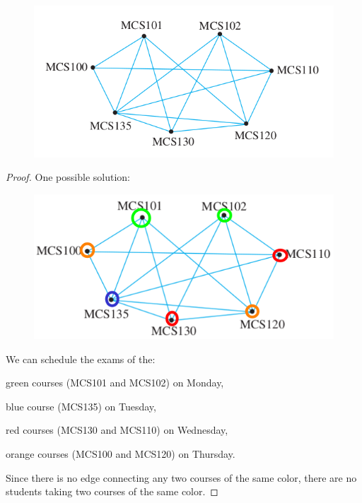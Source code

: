 \documentclass[14pt]{extarticle}
\begin{document}
\begin{figure}[ht!]
\centering
\includegraphics[scale=0.5]{../images/1.4.17.png}
\end{figure}

\begin{proof}
One possible solution:
\begin{figure}[ht!]
\centering
\includegraphics[scale=0.5]{../images/1.4.17.sol.png}
\end{figure}

We can schedule the exams of the:

green courses (MCS101 and MCS102) on Monday,

blue course (MCS135) on Tuesday,

red courses (MCS130 and MCS110) on Wednesday,

orange courses (MCS100 and MCS120) on Thursday.

Since there is no edge connecting any two courses of the same color, there are
no students taking two courses of the same color.
\end{proof}
\end{document}
